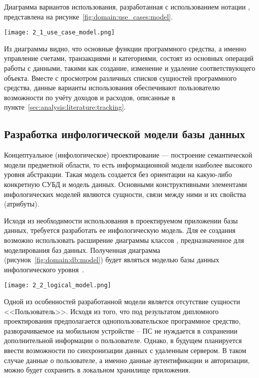 Диаграмма вариантов использования, разработанная с использованием нотации \uml, представлена на рисунке~\ref{fig:domain:use_cases:model}.
\begin{sidewaysfigure}
    \centering
    \texttt{[image: 2\_1\_use\_case\_model.png]}
    \caption{Диаграмма вариантов использования ПС}
    \label{fig:domain:use_cases:model}
\end{sidewaysfigure}

Из диаграммы видно, что основные функции программного средства, а именно управление счетами, транзакциями и категориями, состоят из основных операций работы с данными, такими как создание, изменение и удаление соответствующего объекта.
Вместе с просмотром различных списков сущностей программного средства, данные варианты использования обеспечивают пользователю возможности по учёту доходов и расходов, описанные в пункте~\ref{sec:analysis:literature:tracking}.

\subsection{Разработка инфологической модели базы данных}
\label{sec:domain:db}

Концептуальное (инфологическое) проектирование — построение семантической модели предметной области, то есть информационной модели наиболее высокого уровня абстракции.
Такая модель создается без ориентации на какую-либо конкретную СУБД и модель данных.
Основными конструктивными элементами инфологических моделей являются сущности, связи между ними и их свойства (атрибуты).

Исходя из необходимости использования в проектируемом приложении базы данных, требуется разработать ее инфологическую модель.
Для ее создания возможно использовать расширение диаграммы классов \uml, предназначенное для моделирования баз данных.
Полученная диаграмма (рисунок~\ref{fig:domain:db:model}) будет являться моделью базы данных инфологического уровня~\cite{kulikov_db_workbook}.

\begin{sidewaysfigure}
    \centering
    \texttt{[image: 2\_2\_logical\_model.png]}
    \caption{Инфологическая модель базы данных ПС}
    \label{fig:domain:db:model}
\end{sidewaysfigure}

Одной из особенностей разработанной модели является отсутствие сущности <<Пользователь>>.
Исходя из того, что под результатом дипломного проектирования предполагается однопользовательское программное средство, разворачиваемое на мобильном устройстве -- ПС не нуждается в сохранении дополнительной информации о пользователе.
Однако, в будущем планируется ввести возможности по синхронизации данных с удаленным сервером.
В таком случае данные о пользователе, а именно данные аутентификации и авторизации, можно будет сохранить в локальном хранилище приложения.


